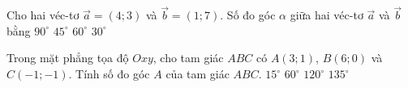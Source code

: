 \begin{ex}%
	Cho hai véc-tơ $\overrightarrow{a}=\left( 4;3 \right)$ và $\overrightarrow{b}=\left( 1;7 \right)$. Số đo góc $\alpha $ giữa hai véc-tơ $\overrightarrow{a}$ và $\overrightarrow{b}$ bằng
	\choice
	{$90^{\circ}$}
	{\True $45^{\circ}$}
	{$60^{\circ}$}
	{$30^{\circ}$}
\end{ex}

\begin{ex}%
	Trong mặt phẳng tọa độ $Oxy$, cho tam giác $ABC$ có $A(3;1)$, $B(6;0)$ và $C(-1;-1)$. Tính số đo góc $A$ của tam giác $ABC$.
	\choice
	{$15^{\circ}$}
	{$60^{\circ}$}
	{\True $120^{\circ}$}
	{$135^{\circ}$}
\end{ex}
